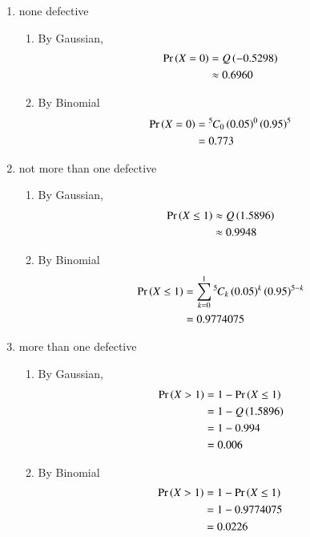 \documentclass[article]{IEEEtran}
\theoremstyle{remark}
\begin{document}
\begin{enumerate}
	\item none defective\\
	\begin{enumerate}
		\item By Gaussian,\\
		\begin{align}
			\Pr\left(X = 0\right) &= Q\left(-0.5298\right)\\			
			&\approx 0.6960 
		\end{align}
		\item By Binomial
		\begin{align}
			\Pr\left(X = 0\right) &= {{}^{5}\mkern-1muC_{0}}\left(0.05\right)^0\left(0.95\right)^{5}\\
			&= 0.773
		\end{align}	
	\end{enumerate}
	\item not more than one defective\\
	\begin{enumerate}
		\item By Gaussian,\\
		\begin{align}
			\Pr\left(X \leq 1\right) &\approx Q\left(1.5896\right)\\
			&\approx 0.9948
		\end{align}
		\item By Binomial
		\begin{align}
			\Pr\left(X \leq 1\right) &= \sum_{k=0}^{1}{{}^{5}\mkern-1muC_{k}}\left(0.05\right)^k\left(0.95\right)^{5-k}\\
			&= 0.9774075
		\end{align}
	\end{enumerate}
	\item more than one defective\\
	\begin{enumerate}
		\item By Gaussian,\\
		\begin{align}
			\Pr\left(X > 1\right) &= 1 - \Pr\left(X \leq 1\right)\\
			&= 1 -  Q\left(1.5896\right)\\
			&= 1 - 0.994\\
			&= 0.006
		\end{align}
		\item By Binomial
		\begin{align}
			\Pr\left(X>1\right) &= 1 - \Pr\left(X \leq 1\right)\\
			&= 1 - 0.9774075\\
			&= 0.0226
		\end{align}	

\end{enumerate}
\end{enumerate}
\end{document}
